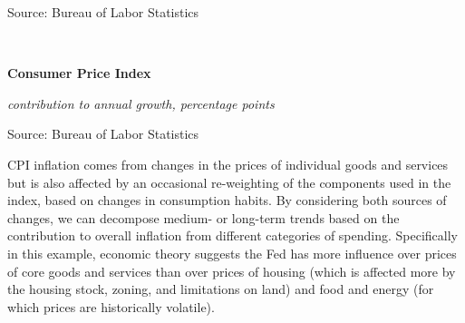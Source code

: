 \documentclass{report}
\newcommand{\tbllink}[1]{\href{https://raw.githubusercontent.com/bdecon/US-chartbook/master/chartbook/data/#1}{\faTable}}
\newcommand{\barylab}[2]{yticklabel style={text width=#1, align=right, 
		style={black!70}, text height=#2},}
\newcommand{\bbar}[2]{extra #1 ticks = {{#2}}, extra #1 tick labels = ,
		extra #1 tick style = {grid=major, grid style={thick, black!25}},}
\newcommand{\barplotnogrid}{xbar=0pt, axis line style={draw=none},
	    yticklabel style={align=left, anchor=east},
      		xmajorticks=false, ymajorgrids=false,   
	    ytick=data, tickwidth=0pt, area legend, reverse legend,
	    nodes near coords, nodes near coords align={horizontal},}
\begin{document}
{{{{{{{{{\begin{minipage}{0.76\textwidth}
\footnotesize{Source: Bureau of Labor Statistics} \hfill \tbllink{cpi.csv}
\end{minipage}

\vspace{2mm}

\begin{minipage}{0.3\textwidth}
\small  \\

 
\end{minipage} \hspace{6mm}
\begin{minipage}{0.4\textwidth}
\normalsize \textbf{Consumer Price Index}

\footnotesize{\textit{contribution to annual growth, percentage points}}
 
\hspace*{-7mm} 

\footnotesize{Source: Bureau of Labor Statistics} \hfill \tbllink{cpi_comp.csv}
\end{minipage}
\newpage
\begin{minipage}{0.76\textwidth}
\small CPI inflation comes from changes in the prices of individual goods and services but is also affected by an occasional re-weighting of the components used in the index, based on changes in consumption habits. By considering both sources of changes, we can decompose medium- or long-term trends based on the contribution to overall inflation from different categories of spending. Specifically in this example, economic theory suggests the Fed has more influence over prices of core goods and services than over prices of housing (which is affected more by the housing stock, zoning, and limitations on land) and food and energy (for which prices are historically volatile). \\


\end{minipage}}}}}}}}}}
\end{document}
